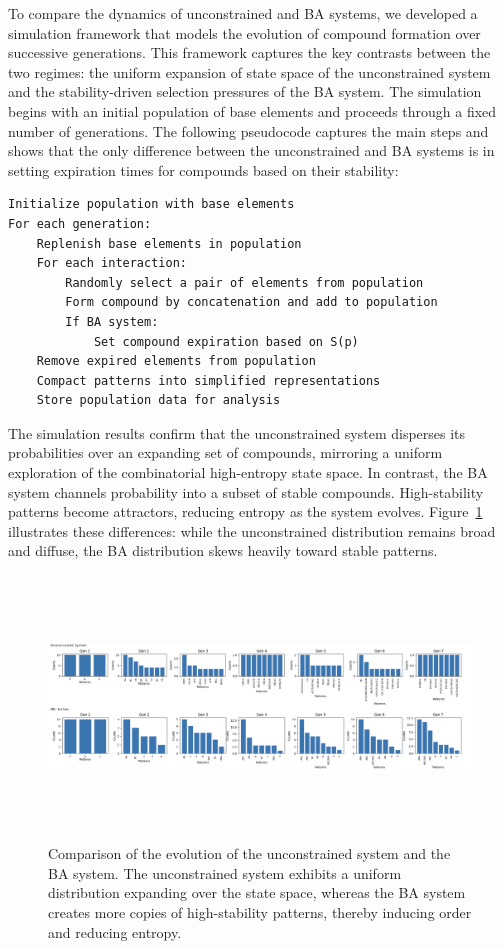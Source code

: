 \documentclass[entropy,article,submit,pdftex,moreauthors]{Definitions/mdpi}
\begin{document}
To compare the dynamics of unconstrained and BA systems, we developed a simulation framework that models the evolution of compound formation over successive generations. This framework captures the key contrasts between the two regimes: the uniform expansion of state space of the unconstrained system and the stability-driven selection pressures of the BA system. The simulation begins with an initial population of base elements and proceeds through a fixed number of generations. The following pseudocode captures the main steps and shows that the only difference between the unconstrained and BA systems is in setting expiration times for compounds based on their stability:

\begin{center}
\begin{minipage}{0.9\textwidth}
\ttfamily
\begin{verbatim}
Initialize population with base elements
For each generation:
    Replenish base elements in population
    For each interaction:
        Randomly select a pair of elements from population
        Form compound by concatenation and add to population
        If BA system:
            Set compound expiration based on S(p)
    Remove expired elements from population
    Compact patterns into simplified representations
    Store population data for analysis
\end{verbatim}
\end{minipage}
\end{center}
The simulation results confirm that the unconstrained system disperses its probabilities over an expanding set of compounds, mirroring a uniform exploration of the combinatorial high-entropy state space. In contrast, the BA system channels probability into a subset of stable compounds. High-stability patterns become attractors, reducing entropy as the system evolves. Figure~\ref{fig:simulation_results} illustrates these differences: while the unconstrained distribution remains broad and diffuse, the BA distribution skews heavily toward stable patterns.

\begin{figure}[h]
    \centering
    \includegraphics[width=1\textwidth,height=7cm]{monte-carlo-fits.png}
    \caption{Comparison of the evolution of the unconstrained system and the BA system. 
    The unconstrained system exhibits a uniform distribution expanding over the state space, 
    whereas the BA system creates more copies of high-stability patterns, 
    thereby inducing order and reducing entropy.}
    \label{fig:simulation_results}
\end{figure}
\end{document}

